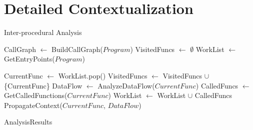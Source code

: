 \newpage
\appendix
\onecolumn

\section{Detailed Contextualization}
\label{detailed-context}

\begin{algorithm}
  \caption{Inter-procedural Analysis}
  \begin{algorithmic}[1]
    \STATE CallGraph $\gets$ BuildCallGraph($Program$)
    \STATE VisitedFuncs $\gets$ $\emptyset$
    \STATE WorkList $\gets$ GetEntryPoints($Program$)

    \STATE CurrentFunc $\gets$ WorkList.pop()
    \STATE VisitedFuncs $\gets$ VisitedFuncs $\cup$ \{CurrentFunc\}
    \STATE DataFlow $\gets$ AnalyzeDataFlow($CurrentFunc$)
    \STATE CalledFuncs $\gets$ GetCalledFunctions($CurrentFunc$)
    \STATE WorkList $\gets$ WorkList $\cup$ CalledFuncs
    \STATE PropagateContext($CurrentFunc$, $DataFlow$)
    \ENDIF
    \ENDWHILE

    \STATE \RETURN AnalysisResults
  \end{algorithmic}
\end{algorithm}
